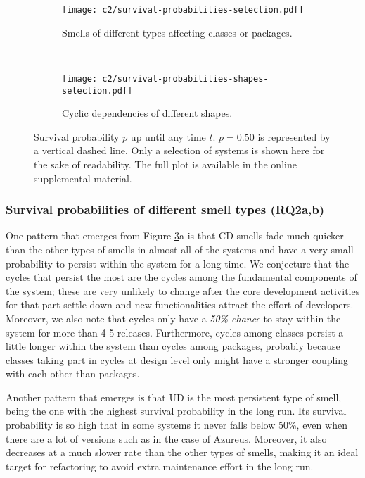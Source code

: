 \begin{figure}[h]
	\centering
    \begin{subfigure}[]{.7\textwidth}
        \centering
        \texttt{[image: c2/survival-probabilities-selection.pdf]}
        \caption{Smells of different types affecting classes or packages.}
        \label{c2:fig:surival-smells} 
    \end{subfigure} \hfill \\
    \begin{subfigure}[]{.7\textwidth}
        \centering
        \texttt{[image: c2/survival-probabilities-shapes-selection.pdf]}
        \caption{Cyclic dependencies of different shapes.}
        \label{c2:fig:survival-shapes} 
    \end{subfigure}
    \caption{Survival probability $p$ up until any time $t$. $p = 0.50$ is represented by a vertical dashed line. Only a selection of systems is shown here for the sake of readability. The full plot is available in the online supplemental material.}
    \label{c2:fig:survival}
\end{figure}

\subsubsection{Survival probabilities of different smell types (RQ2a,b)}
One pattern that emerges from Figure \ref{c2:fig:survival}a is that CD smells fade much quicker than the other types of smells in almost all of the systems and have a very small probability to persist within the system for a long time.
We conjecture that the cycles that persist the most are the cycles among the fundamental components of the system; these are very unlikely to change after the core development activities for that part settle down and new functionalities attract the effort of developers.
Moreover, we also note that cycles only have a \emph{50\% chance} to stay within the system for more than 4-5 releases. Furthermore, cycles among classes persist a little longer within the system than cycles among packages, probably because classes taking part in cycles at design level only might have a stronger coupling with each other than packages.

Another pattern that emerges is that UD is the most persistent type of smell, being the one with the highest survival probability in the long run.
Its survival probability is so high that in some systems it never falls below 50\%, even when there are a lot of versions such as in the case of Azureus.
Moreover, it also decreases at a much slower rate than the other types of smells, making it an ideal target for refactoring to avoid extra maintenance effort in the long run.

